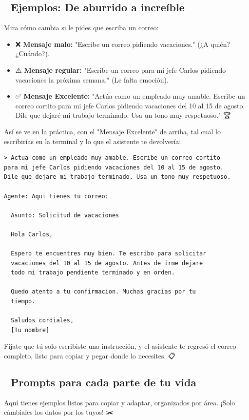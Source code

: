 \documentclass[12pt]{article}
\begin{document}
\subsection{🌟 Ejemplos: De aburrido a increíble}
Mira cómo cambia si le pides que escriba un correo:
\begin{itemize}
    \item ❌ \textbf{Mensaje malo:} "Escribe un correo pidiendo vacaciones." (¿A quién? ¿Cuándo?).
    \item ⚠️ \textbf{Mensaje regular:} "Escribe un correo para mi jefe Carlos pidiendo vacaciones la próxima semana." (Le falta emoción).
    \item ✅ \textbf{Mensaje Excelente:} "Actúa como un empleado muy amable. Escribe un correo cortito para mi jefe Carlos pidiendo vacaciones del 10 al 15 de agosto. Dile que dejaré mi trabajo terminado. Usa un tono muy respetuoso." 🏆
\end{itemize}

Así se ve en la práctica, con el "Mensaje Excelente" de arriba, tal cual lo escribirías en la terminal y lo que el asistente te devolvería:

\begin{verbatim}
> Actua como un empleado muy amable. Escribe un correo cortito
para mi jefe Carlos pidiendo vacaciones del 10 al 15 de agosto.
Dile que dejare mi trabajo terminado. Usa un tono muy respetuoso.

Agente: Aqui tienes tu correo:

  Asunto: Solicitud de vacaciones

  Hola Carlos,

  Espero te encuentres muy bien. Te escribo para solicitar
  vacaciones del 10 al 15 de agosto. Antes de irme dejare
  todo mi trabajo pendiente terminado y en orden.

  Quedo atento a tu confirmacion. Muchas gracias por tu
  tiempo.

  Saludos cordiales,
  [Tu nombre]
\end{verbatim}

Fíjate que tú solo escribiste una instrucción, y el asistente te regresó el correo completo, listo para copiar y pegar donde lo necesites. 📋

\subsection{🧭 Prompts para cada parte de tu vida}
Aquí tienes ejemplos listos para copiar y adaptar, organizados por área. ¡Solo cámbiales los datos por los tuyos! ✂️
\end{document}
